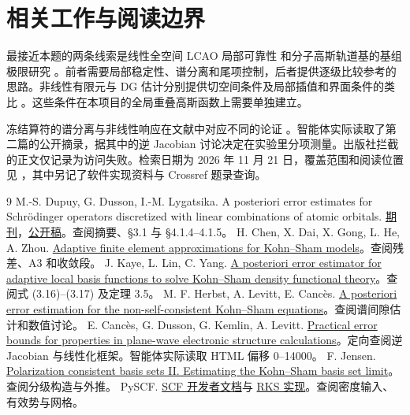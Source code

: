 \documentclass[UTF8,fontset=fandol,zihao=-4,a4paper]{ctexart}
\newcommand{\code}[1]{\texttt{\detokenize{#1}}}
\begin{document}
\clearpage
\section{相关工作与阅读边界}
最接近本题的两条线索是线性全空间 LCAO 局部可靠性 \cite{dupuy} 和分子高斯轨道基的基组极限研究 \cite{jensen}。前者需要局部稳定性、谱分离和尾项控制，后者提供逐级比较参考的思路。非线性有限元与 DG 估计分别提供切空间条件及局部插值和界面条件的类比 \cite{chen,kaye}。这些条件在本项目的全局重叠高斯函数上需要单独建立。

冻结算符的谱分离与非线性响应在文献中对应不同的论证 \cite{herbst,cances}。智能体实际读取了第二篇的公开摘录，据其中的逆 Jacobian 讨论决定在实验里分项测量。出版社拦截的正文仅记录为访问失败。检索日期为 2026 年 11 月 21 日，覆盖范围和阅读位置见 \code{docs/literature.md}，其中另记了软件实现资料与 Crossref 题录查询。

\begingroup
\small
\renewcommand{\refname}{参考文献与查阅位置}
\begin{thebibliography}{9}
 M.-S. Dupuy, G. Dusson, I.-M. Lygatsika. A posteriori error estimates for Schrödinger operators discretized with linear combinations of atomic orbitals. \href{https://doi.org/10.1137/24M1700697}{期刊}，\href{https://arxiv.org/html/2410.04943}{公开稿}。查阅摘要、§3.1 与 §4.1.4--4.1.5。
 H. Chen, X. Dai, X. Gong, L. He, A. Zhou. \href{https://doi.org/10.1137/130916096}{Adaptive finite element approximations for Kohn--Sham models}。查阅残差、A3 和收敛段。
 J. Kaye, L. Lin, C. Yang. \href{https://math.berkeley.edu/~linlin/publications/APostKSDFT.pdf}{A posteriori error estimator for adaptive local basis functions to solve Kohn--Sham density functional theory}。查阅式 (3.16)--(3.17) 及定理 3.5。
 M. F. Herbst, A. Levitt, E. Cancès. \href{https://arxiv.org/abs/2004.13549}{A posteriori error estimation for the non-self-consistent Kohn--Sham equations}。查阅谱间隙估计和数值讨论。
 E. Cancès, G. Dusson, G. Kemlin, A. Levitt. \href{https://arxiv.org/html/2111.01470}{Practical error bounds for properties in plane-wave electronic structure calculations}。定向查阅逆 Jacobian 与线性化框架。智能体实际读取 HTML 偏移 0--14000。
 F. Jensen. \href{https://doi.org/10.1063/1.1465405}{Polarization consistent basis sets II. Estimating the Kohn--Sham basis set limit}。查阅分级构造与外推。
 PySCF. \href{https://pyscf.org/contributor/scf_developer.html}{SCF 开发者文档}与 \href{https://pyscf.org/_modules/pyscf/dft/rks.html}{RKS 实现}。查阅密度输入、有效势与网格。
\end{thebibliography}
\endgroup
\end{document}

